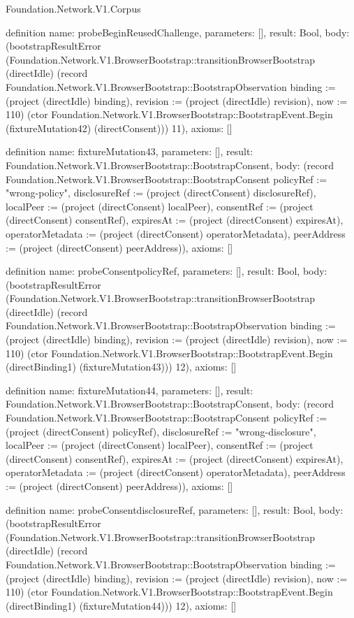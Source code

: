 \begin{lexlean}{Foundation.Network.V1.Corpus}
\begin{semanticmodule}
definition{
  name: probeBeginReusedChallenge,
  parameters: [],
  result: Bool,
  body: (bootstrapResultError (Foundation.Network.V1.BrowserBootstrap::transitionBrowserBootstrap (directIdle) (record Foundation.Network.V1.BrowserBootstrap::BootstrapObservation {binding := (project (directIdle) binding), revision := (project (directIdle) revision), now := 110}) (ctor Foundation.Network.V1.BrowserBootstrap::BootstrapEvent.Begin (fixtureMutation42) (directConsent))) 11),
  axioms: []
}

definition{
  name: fixtureMutation43,
  parameters: [],
  result: Foundation.Network.V1.BrowserBootstrap::BootstrapConsent,
  body: (record Foundation.Network.V1.BrowserBootstrap::BootstrapConsent {policyRef := "wrong-policy", disclosureRef := (project (directConsent) disclosureRef), localPeer := (project (directConsent) localPeer), consentRef := (project (directConsent) consentRef), expiresAt := (project (directConsent) expiresAt), operatorMetadata := (project (directConsent) operatorMetadata), peerAddress := (project (directConsent) peerAddress)}),
  axioms: []
}

definition{
  name: probeConsentpolicyRef,
  parameters: [],
  result: Bool,
  body: (bootstrapResultError (Foundation.Network.V1.BrowserBootstrap::transitionBrowserBootstrap (directIdle) (record Foundation.Network.V1.BrowserBootstrap::BootstrapObservation {binding := (project (directIdle) binding), revision := (project (directIdle) revision), now := 110}) (ctor Foundation.Network.V1.BrowserBootstrap::BootstrapEvent.Begin (directBinding1) (fixtureMutation43))) 12),
  axioms: []
}

definition{
  name: fixtureMutation44,
  parameters: [],
  result: Foundation.Network.V1.BrowserBootstrap::BootstrapConsent,
  body: (record Foundation.Network.V1.BrowserBootstrap::BootstrapConsent {policyRef := (project (directConsent) policyRef), disclosureRef := "wrong-disclosure", localPeer := (project (directConsent) localPeer), consentRef := (project (directConsent) consentRef), expiresAt := (project (directConsent) expiresAt), operatorMetadata := (project (directConsent) operatorMetadata), peerAddress := (project (directConsent) peerAddress)}),
  axioms: []
}

definition{
  name: probeConsentdisclosureRef,
  parameters: [],
  result: Bool,
  body: (bootstrapResultError (Foundation.Network.V1.BrowserBootstrap::transitionBrowserBootstrap (directIdle) (record Foundation.Network.V1.BrowserBootstrap::BootstrapObservation {binding := (project (directIdle) binding), revision := (project (directIdle) revision), now := 110}) (ctor Foundation.Network.V1.BrowserBootstrap::BootstrapEvent.Begin (directBinding1) (fixtureMutation44))) 12),
  axioms: []
}


\end{semanticmodule}
\end{lexlean}
